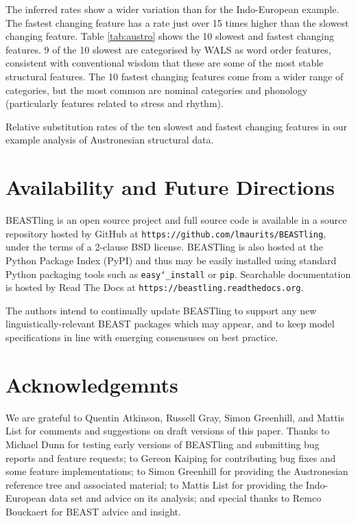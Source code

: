\documentclass[twocolumn,10pt]{scrartcl}
\begin{document}
The inferred rates show a wider variation than for the Indo-European example.  The fastest changing feature has a rate just over 15 times higher than the slowest changing feature.  Table \ref{tab:austro} shows the 10 slowest and fastest changing features.  9 of the 10 slowest are categorised by WALS as word order features, consistent with conventional wisdom that these are some of the most stable structural features.  The 10 fastest changing features come from a wider range of categories, but the most common are nominal categories and phonology (particularly features related to stress and rhythm).

\begin{table*}[ht]
	\begin{center}
		
	\end{center}
	\caption{Relative substitution rates of the ten slowest and fastest changing features in our example analysis of Austronesian structural data.}
\label{tab:austro}
\end{table*}

\section{Availability and Future Directions}

BEASTling is an open source project and full source code is available in a source repository hosted by GitHub at \texttt{https://github.com/lmaurits/BEASTling}, under the terms of a 2-clause BSD license.  BEASTling is also hosted at the Python Package Index (PyPI) and thus may be easily installed using standard Python packaging tools such as \texttt{easy\char`_install} or \texttt{pip}.  Searchable documentation is hosted by Read The Docs at \texttt{https://beastling.readthedocs.org}.

The authors intend to continually update BEASTling to support any new linguistically-relevant BEAST packages which may appear, and to keep model specifications in line with emerging consensuses on best practice.

\section{Acknowledgemnts}

We are grateful to Quentin Atkinson, Russell Gray, Simon Greenhill, and Mattis List for comments and suggestions on draft versions of this paper.  Thanks to Michael Dunn for testing early versions of BEASTling and submitting bug reports and feature requests; to Gereon Kaiping for contributing bug fixes and some feature implementations; to Simon Greenhill for providing the Austronesian reference tree and associated material; to Mattis List for providing the Indo-European data set and advice on its analysis; and special thanks to Remco Bouckaert for BEAST advice and insight.




\end{document}
